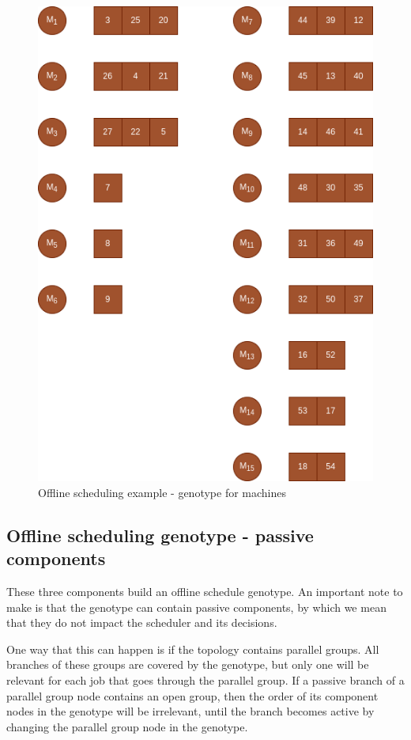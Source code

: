 \begin{figure}[!htbp]
	\centering
	\includegraphics[scale=0.6]{../images/offline_scheduling_genotype_machine.png}
	\caption{Offline scheduling example - genotype for machines}
    \label{fig:offline_scheduling_genotype_machine}
\end{figure}

\subsection{Offline scheduling genotype - passive components}

These three components build an offline schedule genotype. An important note to make is that the genotype can contain passive components, by which we mean that they do not impact the scheduler and its decisions. 

One way that this can happen is if the topology contains parallel groups. All branches of these groups are covered by the genotype, but only one will be relevant for each job that goes through the parallel group. If a passive branch of a parallel group node contains an open group, then the order of its component nodes in the genotype will be irrelevant, until the branch becomes active by changing the parallel group node in the genotype. 

